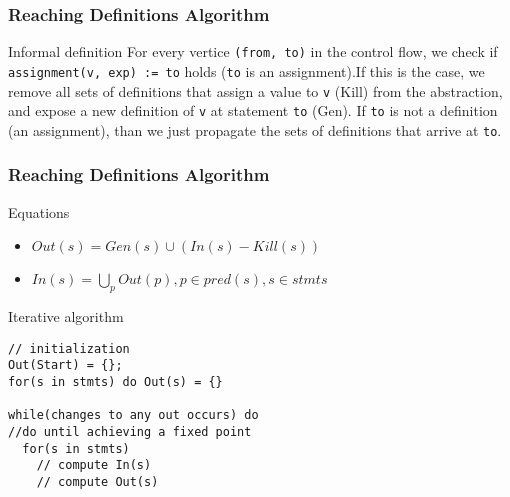 
\begin{frame}
  \frametitle{Reaching Definitions Algorithm}

  \begin{block}{Informal definition}
   For every vertice \texttt{(from, to)} in the control flow,
   we check if \texttt{assignment(v, exp) := to} holds (\texttt{to} is
   an assignment).\pause If this is the case, we remove all sets of  definitions that
   assign a value to \texttt{v} ({\color{blue}Kill}) from the abstraction, and expose a new
   definition of \texttt{v} at statement \texttt{to} ({\color{blue}Gen}).
   If \texttt{to} is not a definition (an assignment), than we just propagate the
   sets of definitions that arrive at \texttt{to}.
  \end{block} 
\end{frame}

\begin{frame}[fragile]
  \frametitle{Reaching Definitions Algorithm}

  \begin{block}{Equations}
    \begin{itemize}
    \item $Out(s) = Gen(s) \cup (In(s) - Kill(s))$  
    \item $In(s) = \bigcup_p Out(p), p \in pred(s), s \in stmts$
    \end{itemize}
  \end{block}

  \pause

\begin{block}{Iterative algorithm}
\begin{small}
\begin{verbatim}
// initialization
Out(Start) = {};
for(s in stmts) do Out(s) = {} 

while(changes to any out occurs) do  
//do until achieving a fixed point
  for(s in stmts)
    // compute In(s) 
    // compute Out(s)   
\end{verbatim}
\end{small}
\end{block}
\end{frame}


